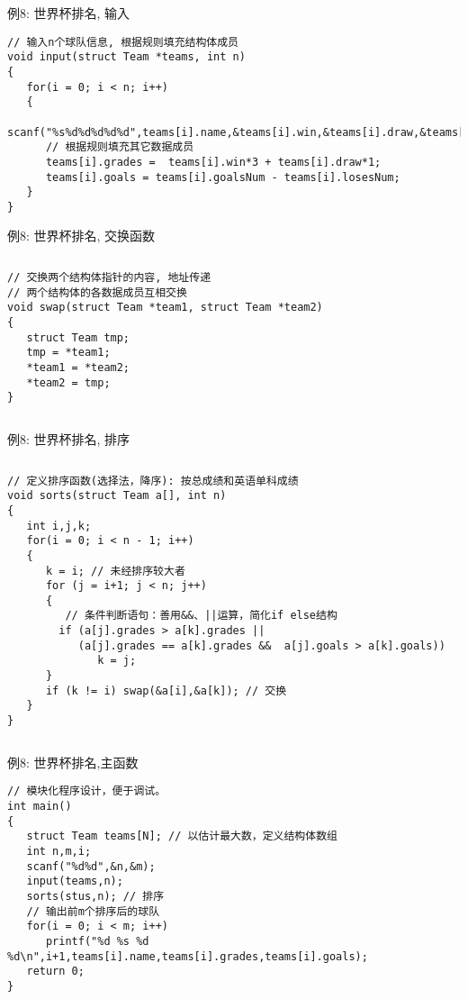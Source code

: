 \begin{frame}{例8: 世界杯排名, 输入}
\begin{lstlisting}
// 输入n个球队信息, 根据规则填充结构体成员
void input(struct Team *teams, int n)
{
   for(i = 0; i < n; i++)
   {
      scanf("%s%d%d%d%d%d",teams[i].name,&teams[i].win,&teams[i].draw,&teams[i].lose,&teams[i].goalsNum,&teams[i].losesNum);
      // 根据规则填充其它数据成员
      teams[i].grades =  teams[i].win*3 + teams[i].draw*1;
      teams[i].goals = teams[i].goalsNum - teams[i].losesNum; 
   }
}
\end{lstlisting}
\end{frame}

\begin{frame}{例8: 世界杯排名, 交换函数}
\begin{columns}[T]
\begin{lstlisting}
// 交换两个结构体指针的内容, 地址传递
// 两个结构体的各数据成员互相交换 
void swap(struct Team *team1, struct Team *team2)
{
   struct Team tmp;
   tmp = *team1; 
   *team1 = *team2; 
   *team2 = tmp;
}
\end{lstlisting}
\end{columns}
\medskip
\end{frame}

\begin{frame}{例8: 世界杯排名, 排序}
\vspace{-0.5cm}
\begin{columns}[T]
\begin{lstlisting}
// 定义排序函数(选择法，降序): 按总成绩和英语单科成绩 
void sorts(struct Team a[], int n)
{
   int i,j,k;
   for(i = 0; i < n - 1; i++)
   {
      k = i; // 未经排序较大者
      for (j = i+1; j < n; j++)
      {
         // 条件判断语句：善用&&、||运算，简化if else结构 
        if (a[j].grades > a[k].grades || 
           (a[j].grades == a[k].grades &&  a[j].goals > a[k].goals))  
              k = j;
      }
      if (k != i) swap(&a[i],&a[k]); // 交换
   } 
}
\end{lstlisting}
\end{columns}
\medskip
\end{frame}

\begin{frame}{例8: 世界杯排名,主函数}
\vspace{-0.4cm}
\begin{lstlisting}
// 模块化程序设计，便于调试。
int main()
{
   struct Team teams[N]; // 以估计最大数，定义结构体数组 
   int n,m,i;
   scanf("%d%d",&n,&m);
   input(teams,n); 
   sorts(stus,n); // 排序
   // 输出前m个排序后的球队 
   for(i = 0; i < m; i++)
      printf("%d %s %d %d\n",i+1,teams[i].name,teams[i].grades,teams[i].goals);
   return 0;
}
\end{lstlisting}
\end{frame}

